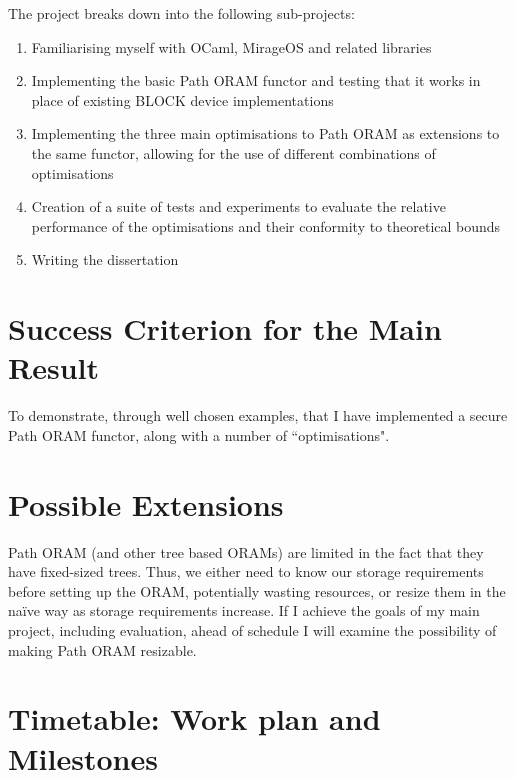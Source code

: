 \documentclass[12pt,a4paper,twoside]{article}
\begin{document}
The project breaks down into the following sub-projects:

\begin{enumerate}

\item Familiarising myself with OCaml, MirageOS and related libraries

\item Implementing the basic Path ORAM functor and testing that it works in place of existing BLOCK device implementations

\item Implementing the three main optimisations to Path ORAM as extensions to the same functor, allowing for the use of different combinations of optimisations

\item Creation of a suite of tests and experiments to evaluate the relative performance of the optimisations and their conformity to theoretical bounds

\item Writing the dissertation

\end{enumerate}

\section*{Success Criterion for the Main Result}

To demonstrate, through well chosen examples, that I have implemented a secure Path ORAM functor, along with a number of ``optimisations".

\section*{Possible Extensions}

Path ORAM (and other tree based ORAMs) are limited in the fact that they have fixed-sized trees. Thus, we either need to know our storage requirements before setting up the ORAM, potentially wasting resources, or resize them in the na\"ive way as storage requirements increase. If I achieve the goals of my main project, including evaluation, ahead of schedule I will examine the possibility of making Path ORAM resizable.

\section*{Timetable: Work plan and Milestones}
\end{document}
